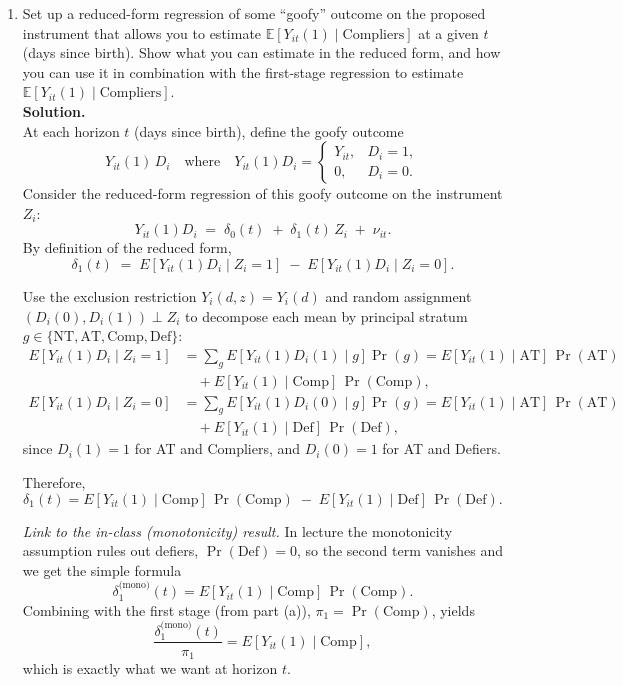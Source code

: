 \documentclass[12pt]{article}
\begin{document}
\begin{enumerate}[label=\textbf{(\alph*)}, leftmargin=1.5em]
  \item Set up a reduced-form regression of some ``goofy'' outcome on the proposed instrument that allows you to estimate $\mathbb{E}[Y_{it}(1)\mid\text{Compliers}]$ at a given $t$ (days since birth). Show what you can estimate in the reduced form, and how you can use it in combination with the first-stage regression to estimate $\mathbb{E}[Y_{it}(1)\mid\text{Compliers}]$.\\[0.5em]
  \textbf{Solution.} \\

  At each horizon $t$ (days since birth), define the goofy outcome
  \[
  Y_{it}(1)\,D_i \quad\text{where}\quad
  Y_{it}(1)D_i =
  \begin{cases}
  Y_{it}, & D_i=1,\\
  0, & D_i=0.
  \end{cases}
  \]
  Consider the reduced-form regression of this goofy outcome on the instrument $Z_i$:
  \[
  Y_{it}(1)D_i \;=\; \delta_0(t) \;+\; \delta_1(t)\,Z_i \;+\; \nu_{it}.
  \]
  By definition of the reduced form,
  \[
  \delta_1(t)\;=\; E\!\left[Y_{it}(1)D_i \mid Z_i=1\right]
  \;-\; E\!\left[Y_{it}(1)D_i \mid Z_i=0\right].
  \]

  Use the exclusion restriction $Y_i(d,z)=Y_i(d)$ and random assignment $(D_i(0),D_i(1))\!\perp\! Z_i$ to decompose each mean by principal stratum $g\in\{\text{NT},\text{AT},\text{Comp},\text{Def}\}$:
  \[
  \begin{aligned}
  E\!\left[Y_{it}(1)D_i \mid Z_i=1\right]
  &= \sum_{g} E\!\left[Y_{it}(1)D_i(1)\mid g\right]\Pr(g)
  = E[Y_{it}(1)\mid \text{AT}]\,\Pr(\text{AT}) \\
  &\quad + E[Y_{it}(1)\mid \text{Comp}]\,\Pr(\text{Comp}), \\[4pt]
  E\!\left[Y_{it}(1)D_i \mid Z_i=0\right]
  &= \sum_{g} E\!\left[Y_{it}(1)D_i(0)\mid g\right]\Pr(g)
  = E[Y_{it}(1)\mid \text{AT}]\,\Pr(\text{AT}) \\
  &\quad + E[Y_{it}(1)\mid \text{Def}]\,\Pr(\text{Def}),
  \end{aligned}
  \]
  since $D_i(1)=1$ for AT and Compliers, and $D_i(0)=1$ for AT and Defiers.

  Therefore,
  \[
  \delta_1(t)
  = E[Y_{it}(1)\mid \text{Comp}]\,\Pr(\text{Comp})
  \;-\; E[Y_{it}(1)\mid \text{Def}]\,\Pr(\text{Def}).
  \]

  \emph{Link to the in-class (monotonicity) result.} In lecture the monotonicity assumption rules out defiers, $\Pr(\text{Def})=0$, so the second term vanishes and we get the simple formula
  \[
  \delta_1^{\text{(mono)}}(t)
  = E[Y_{it}(1)\mid \text{Comp}]\,\Pr(\text{Comp}).
  \]
  Combining with the first stage (from part (a)), $\pi_1=\Pr(\text{Comp})$, yields
  \[
  \frac{\delta_1^{\text{(mono)}}(t)}{\pi_1}
  = E[Y_{it}(1)\mid \text{Comp}],
  \]
  which is exactly what we want at horizon $t$.


\end{enumerate}
\end{document}
